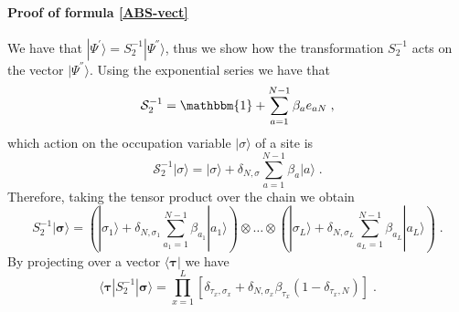 \documentclass[10pt]{article}
\numberwithin{equation}{section}
\numberwithin{equation}{subsection}
\newcommand{\co}{\;,}
\newcommand{\dt}{\;.}
\newcommand{\com}[1]{{ (* {\color{red}\small #1}*)}}
\begin{document}
\paragraph{Proof of formula \eqref{ABS-vect}} We have that $|\Psi^{'}\rangle=S_{2}^{-1}|\Psi^{''}\rangle$, thus we  show how the transformation $S_{2}^{-1}$ acts on the vector $|\Psi^{''}\rangle$. Using the exponential series we have that  
\begin{equation}
   \mathcal{S}_{2}^{-1}=\mathbbm{1}+\sum_{a=1}^{N-1}\beta_{a}e_{aN}\co
\end{equation}
which action on the occupation variable $|\sigma\rangle$ of a site is 
\begin{equation}
  \mathcal{S}_{2}^{-1} |\sigma\rangle= |\sigma\rangle+\delta_{N,\sigma}\sum_{a=1}^{N-1}\beta_a|a\rangle\dt
\end{equation} 
Therefore, taking the tensor product over the chain we obtain 
\begin{equation}
 S_{2}^{-1} |\bm{\sigma}\rangle=\left( |\sigma_1\rangle+\delta_{N,\sigma_1}\sum_{a_1=1}^{N-1}\beta_{a_1}|a_1\rangle\right)\otimes\ldots\otimes \left( |\sigma_L\rangle+\delta_{N,\sigma_L}\sum_{a_L=1}^{N-1}\beta_{a_L}|a_L\rangle\right)\dt
\end{equation} 
By projecting over a vector $\langle \bm{\tau}|$ we have 
\begin{equation}\label{goodTP-S2}
  \langle \bm{\tau}|S_{2}^{-1} |\bm{\sigma}\rangle=\prod_{x=1}^L\left[ \delta_{\tau_x,\sigma_x}+\delta_{N,\sigma_x}\beta_{\tau_x} (1-\delta_{\tau_x,N})\right]\dt
\end{equation} 
\begin{comment}
{\color{blue}
We introduce $\forall x\in\{1,\ldots,L\}$, for $i\in \{1,\ldots,L\}$ and $q_{1},\ldots,q_{i}\in\{1,\ldots,L\}$ 
\begin{equation}
	\varphi_{x}^{i}(q_{1},\ldots,q_{i})=\begin{cases}
		\tau_{x}\qquad &\text{if}\quad x\notin\{q_{1},\ldots,q_{i}\}\\
		N\qquad &\text{if}\quad x\in\{q_{1},\ldots,q_{i}\}\\
	\end{cases}\dt
\end{equation}
This is a new configuration at site $x$ where, if $x\in\{q_{1},\ldots,q_{i}\}$, the occupation $\tau_{x}$ is replaced by $N$, while it is left uncaged if $x\notin \{q_{1},\ldots,q_{i}\}$. The dependence of $\varphi_{x}^{i}(q_{1},\ldots,q_{i})$ with respect to $q_{1},\ldots,q_{i}$ is usually understood for the sake of notation. } 
\end{comment}
\end{document}
